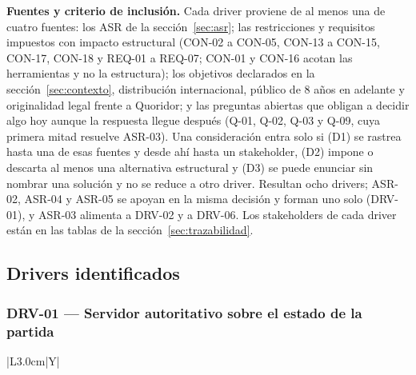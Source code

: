 \textbf{Fuentes y criterio de inclusión.} Cada driver proviene de al menos una de cuatro fuentes: los ASR de la sección~\ref{sec:asr}; las restricciones y requisitos impuestos con impacto estructural (CON-02 a CON-05, CON-13 a CON-15, CON-17, CON-18 y REQ-01 a REQ-07; CON-01 y CON-16 acotan las herramientas y no la estructura); los objetivos declarados en la sección~\ref{sec:contexto}, distribución internacional, público de 8 años en adelante y originalidad legal frente a Quoridor; y las preguntas abiertas que obligan a decidir algo hoy aunque la respuesta llegue después (Q-01, Q-02, Q-03 y Q-09, cuya primera mitad resuelve ASR-03). Una consideración entra solo si (D1) se rastrea hasta una de esas fuentes y desde ahí hasta un stakeholder, (D2) impone o descarta al menos una alternativa estructural y (D3) se puede enunciar sin nombrar una solución y no se reduce a otro driver. Resultan ocho drivers; ASR-02, ASR-04 y ASR-05 se apoyan en la misma decisión y forman uno solo (DRV-01), y ASR-03 alimenta a DRV-02 y a DRV-06. Los stakeholders de cada driver están en las tablas de la sección~\ref{sec:trazabilidad}.

\subsection{Drivers identificados}

\Needspace*{0.12\textheight}
\subsubsection*{DRV-01 --- Servidor autoritativo sobre el estado de la partida}

\begin{tabla}{|L{3.0cm}|Y|}
\fichacab
{}
\end{tabla}

